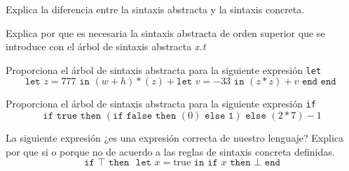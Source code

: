     \begin{exercise}
        Explica la diferencia entre la sintaxis abstracta y la sintaxis concreta.
    \end{exercise}
\bigskip
    \begin{exercise}
        Explica por que es necesaria la sintaxis abstracta de orden superior que se introduce con el árbol de sintaxis abstracta \textit{x.t}
    \end{exercise}

\bigskip
    \begin{exercise}
        Proporciona el árbol de sintaxis abstracta para la siguiente expresión \texttt{let}
        \[ 
            \texttt{let } z = 777 \texttt{ in } (w + h) * (z) + \texttt{let } v = -33 \texttt{ in } (z * z) + v \texttt{ end } \texttt{end } 
        \]
    \end{exercise}

    \bigskip
    
    \begin{exercise}
        Proporciona el árbol de sintaxis abstracta para la siguiente expresión \texttt{if}
        \[
            \texttt{if } \texttt{true} \texttt{ then } (\texttt{if }  \texttt{false} \texttt{ then } (0) \texttt{ else 1}) \texttt{ else } (2 * 7) - 1
        \]
    \end{exercise}

    \bigskip
    
    \begin{exercise}
        La siguiente expresión ¿es una expresión correcta de nuestro lenguaje? Explica por que si o porque no de acuerdo a las reglas de sintaxis concreta definidas.
        \[
            \texttt{if } \top \texttt{ then } \texttt{ let } x = \text{true} \texttt{ in} \texttt{ if } x \texttt{ then } \bot \texttt{ end} 
        \]
    \end{exercise}

    \bigskip
    
